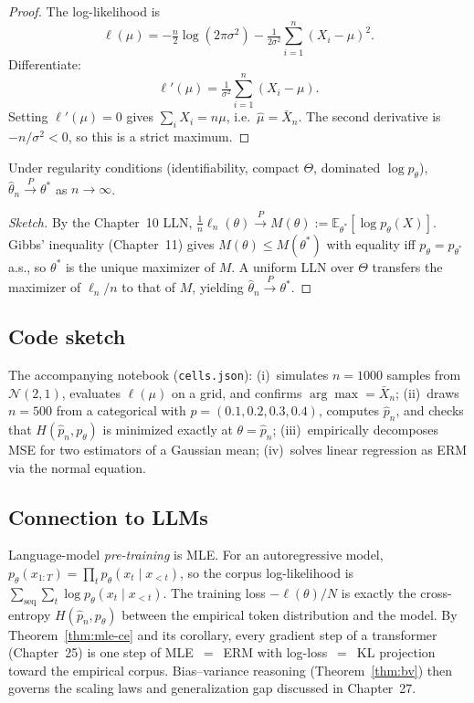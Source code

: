\begin{proof}
The log-likelihood is
\[
\ell(\mu) = -\tfrac{n}{2}\log(2\pi\sigma^2) - \tfrac{1}{2\sigma^2}\sum_{i=1}^n (X_i-\mu)^2.
\]
Differentiate:
\[
\ell'(\mu) = \tfrac{1}{\sigma^2}\sum_{i=1}^n (X_i - \mu).
\]
Setting $\ell'(\mu)=0$ gives $\sum_i X_i = n\mu$, i.e.\ $\hat\mu = \bar X_n$. The second derivative is $-n/\sigma^2 < 0$, so this is a strict maximum.
\end{proof}

\begin{theorem}\label{thm:consistency}
Under regularity conditions (identifiability, compact $\Theta$, dominated $\log p_\theta$), $\hat\theta_n \xrightarrow{P} \theta^*$ as $n \to \infty$.
\end{theorem}

\begin{proof}[Sketch]
By the Chapter~10 LLN, $\tfrac{1}{n}\ell_n(\theta) \xrightarrow{P} M(\theta) := \mathbb{E}_{\theta^*}[\log p_\theta(X)]$. Gibbs' inequality (Chapter~11) gives $M(\theta) \le M(\theta^*)$ with equality iff $p_\theta = p_{\theta^*}$ a.s., so $\theta^*$ is the unique maximizer of $M$. A uniform LLN over $\Theta$ transfers the maximizer of $\ell_n/n$ to that of $M$, yielding $\hat\theta_n \xrightarrow{P} \theta^*$.
\end{proof}

\subsection*{Code sketch}

The accompanying notebook (\texttt{cells.json}): (i)~simulates $n=1000$ samples from $\mathcal{N}(2,1)$, evaluates $\ell(\mu)$ on a grid, and confirms $\arg\max = \bar X_n$; (ii)~draws $n=500$ from a categorical with $p=(0.1,0.2,0.3,0.4)$, computes $\hat p_n$, and checks that $H(\hat p_n,p_\theta)$ is minimized exactly at $\theta = \hat p_n$; (iii)~empirically decomposes MSE for two estimators of a Gaussian mean; (iv)~solves linear regression as ERM via the normal equation.

\subsection*{Connection to LLMs}

\begin{remark}
Language-model \emph{pre-training} is MLE. For an autoregressive model, $p_\theta(x_{1:T}) = \prod_{t} p_\theta(x_t \mid x_{<t})$, so the corpus log-likelihood is $\sum_{\mathrm{seq}}\sum_t \log p_\theta(x_t\mid x_{<t})$. The training loss $-\ell(\theta)/N$ is exactly the cross-entropy $H(\hat p_n, p_\theta)$ between the empirical token distribution and the model. By Theorem~\ref{thm:mle-ce} and its corollary, every gradient step of a transformer (Chapter~25) is one step of MLE~$=$~ERM with log-loss~$=$~KL projection toward the empirical corpus. Bias--variance reasoning (Theorem~\ref{thm:bv}) then governs the scaling laws and generalization gap discussed in Chapter~27.
\end{remark}
